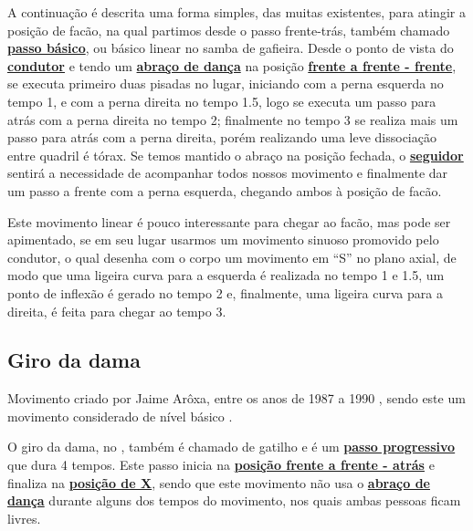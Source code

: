 A continuação é descrita uma forma simples, das muitas existentes, para atingir a posição de facão,
na qual partimos desde o passo frente-trás, também chamado \hyperref[subsec:passobasico]{\textbf{passo básico}}, 
ou básico linear no samba de gafieira. 
Desde o ponto de vista do \hyperref[def:Condutor]{\textbf{condutor}} e 
tendo um \hyperref[def:abracodedanca]{\textbf{abraço de dança}} 
na posição \hyperref[def:fff-position]{\textbf{frente a frente - frente}},
se executa primeiro duas pisadas no lugar, iniciando com a perna esquerda no tempo 1, 
e com a perna direita no tempo 1.5,
logo se executa um passo  para atrás com a perna direita no tempo 2; 
finalmente no tempo 3 se realiza mais um passo para atrás com a perna direita,
porém realizando uma leve dissociação entre quadril é tórax. 
Se temos mantido o abraço na posição fechada, 
o \hyperref[def:Seguidor]{\textbf{seguidor}} sentirá a 
necessidade de acompanhar todos nossos movimento e finalmente dar um passo a frente com a perna esquerda,
chegando ambos à posição de facão.  

Este movimento linear é pouco interessante para chegar ao facão, mas pode ser apimentado,
se em seu lugar usarmos um movimento sinuoso promovido pelo condutor, 
o qual desenha com o corpo um movimento em ``S'' no plano axial, 
de modo que uma ligeira curva para a esquerda é realizada no tempo 1 e 1.5,
um ponto de inflexão é gerado no tempo 2 e, 
finalmente, uma ligeira curva para a direita, é feita para chegar ao tempo 3. 


\subsection{Giro da dama}

Movimento criado por Jaime Arôxa, entre os anos de 1987 a 1990 \cite{EntrevistaJaimeAroxa1},
sendo este um movimento considerado de nível básico \cite[pp. 144]{perna2002samba}.

O giro da dama, no \AnoLivro, também é chamado de gatilho e 
é um \hyperref[def:PassoDeDeslocamento]{\textbf{passo progressivo}} que dura 4 tempos.
Este passo inicia na \hyperref[def:ffa-position]{\textbf{posição frente a frente - atrás}} e 
finaliza na \hyperref[def:X-position]{\textbf{posição de X}},
sendo que este movimento não usa o \hyperref[def:abracodedanca]{\textbf{abraço de dança}} 
durante alguns dos tempos do movimento,
nos quais ambas pessoas ficam livres.

